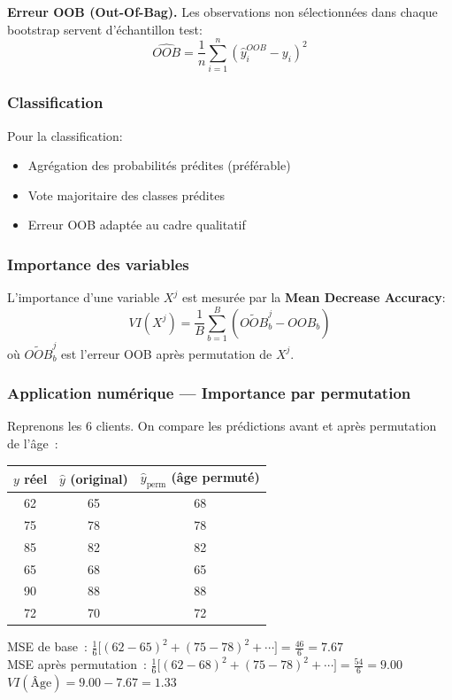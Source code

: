 \documentclass[a4paper,12pt]{article}
\begin{document}
\textbf{Erreur OOB (Out-Of-Bag).} Les observations non sélectionnées dans chaque bootstrap servent d'échantillon test:
\[
\widehat{OOB} = \frac{1}{n} \sum_{i=1}^{n} \left( \hat{y}_i^{OOB} - y_i \right)^2
\]

\subsubsection{Classification}
Pour la classification:
\begin{itemize}
  \item Agrégation des probabilités prédites (préférable)
  \item Vote majoritaire des classes prédites
  \item Erreur OOB adaptée au cadre qualitatif
\end{itemize}

\subsubsection{Importance des variables}
L'importance d'une variable $X^j$ est mesurée par la \textbf{Mean Decrease Accuracy}:
\[
VI(X^j) = \frac{1}{B} \sum_{b=1}^{B} \left( \widetilde{OOB}_b^j - OOB_b \right)
\]
où $\widetilde{OOB}_b^j$ est l'erreur OOB après permutation de $X^j$.

\subsubsection*{Application numérique — Importance par permutation}
Reprenons les 6 clients. On compare les prédictions avant et après permutation de l'âge~:

\begin{center}
\begin{tabular}{c|c|c}
$y$ réel & $\hat{y}$ (original) & $\hat{y}_{\text{perm}}$ (âge permuté) \\
\midrule
62 & 65 & 68 \\
75 & 78 & 78 \\
85 & 82 & 82 \\
65 & 68 & 65 \\
90 & 88 & 88 \\
72 & 70 & 72 \\
\end{tabular}
\end{center}

\noindent MSE de base~: $\frac16\bigl[(62-65)^2+(75-78)^2+\cdots\bigr] = \frac{46}{6} = 7.67$ \\
MSE après permutation~: $\frac16\bigl[(62-68)^2+(75-78)^2+\cdots\bigr] = \frac{54}{6} = 9.00$ \\
$VI(\text{Âge}) = 9.00 - 7.67 = 1.33$
\end{document}
